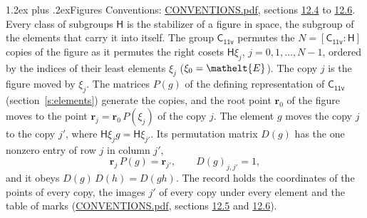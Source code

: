 \documentclass[10pt,a4paper]{article}
\makeatletter
\renewcommand\section{\@startsection{section}{1}{\z@}{-3ex plus -1ex minus -.2ex}%
  {1.2ex plus .2ex}{\normalfont\large\sffamily\bfseries\color{parttitle}}}
\numberwithin{equation}{section}
\newcommand{\eltfont}[1]{{\let\sigma\eltsigma\mathelt{#1}}}
\newcommand{\grp}[1]{\mathsf{#1}}
\newcommand{\cls}[1]{\eltfont{#1}}
\newcommand{\pointr}{\mathbf{r}}
\makeatother
\begin{document}
\section{Figures}\label{s:permutation}
Conventions: \href{../../CONVENTIONS.pdf}{CONVENTIONS.pdf}, sections \href{../../CONVENTIONS.pdf\#conv.12.4}{12.4} to \href{../../CONVENTIONS.pdf\#conv.12.6}{12.6}.
Every class of subgroups $\grp{H}$ is the stabilizer of a figure in space, the subgroup of the elements that carry it into itself. \label{n:local.orbit.size}\label{n:element.coset.least}\label{n:index.coset}The group $\grp{C_{11v}}$ permutes the $N = [\grp{C_{11v}} : \grp{H}]$ copies of the figure as it permutes the right cosets $\grp{H}\xi_j$, $j = 0, 1, \dots, N - 1$, ordered by the indices of their least elements $\xi_j$ ($\xi_0 = \cls{E}$). The copy $j$ is the figure moved by $\xi_j$. The matrices $P(g)$ of the defining representation of $\grp{C_{11v}}$ (section~\ref{s:elements}) generate the copies, and the root point $\pointr_0$ of the figure moves to the point $\pointr_j = \pointr_0\, P(\xi_j)$ of the copy $j$. \label{n:local.coset.image}The element $g$ moves the copy $j$ to the copy $j'$, where $\grp{H}\xi_j g = \grp{H}\xi_{j'}$. \label{n:local.matrix.permutation}Its permutation matrix $D(g)$ has the one nonzero entry of row $j$ in column $j'$,
\begin{equation}\label{e:perm.matrix}\pointr_j\, P(g) = \pointr_{j'}, \qquad D(g)_{j,j'} = 1,\end{equation}
and it obeys $D(g)\, D(h) = D(gh)$. The record holds the coordinates of the points of every copy, the images $j'$ of every copy under every element and the table of marks (\href{../../CONVENTIONS.pdf}{CONVENTIONS.pdf}, sections \href{../../CONVENTIONS.pdf\#conv.12.5}{12.5} and \href{../../CONVENTIONS.pdf\#conv.12.6}{12.6}).
\end{document}
